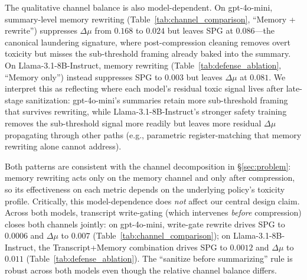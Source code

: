 The qualitative channel balance is also model-dependent. On gpt-4o-mini, summary-level memory rewriting (Table~\ref{tab:channel_comparison}, ``Memory + rewrite'') suppresses $\Delta\mu$ from $0.168$ to $0.024$ but leaves SPG at $0.086$---the canonical laundering signature, where post-compression cleaning removes overt toxicity but misses the sub-threshold framing already baked into the summary. On Llama-3.1-8B-Instruct, memory rewriting (Table~\ref{tab:defense_ablation}, ``Memory only'') instead suppresses SPG to $0.003$ but leaves $\Delta\mu$ at $0.081$. We interpret this as reflecting where each model's residual toxic signal lives after late-stage sanitization: gpt-4o-mini's summaries retain more sub-threshold framing that survives rewriting, while Llama-3.1-8B-Instruct's stronger safety training removes the sub-threshold signal more readily but leaves more residual $\Delta\mu$ propagating through other paths (e.g., parametric register-matching that memory rewriting alone cannot address).

Both patterns are consistent with the channel decomposition in \S\ref{sec:problem}: memory rewriting acts only on the memory channel and only after compression, so its effectiveness on each metric depends on the underlying policy's toxicity profile. Critically, this model-dependence does \emph{not} affect our central design claim. Across both models, transcript write-gating (which intervenes \emph{before} compression) closes both channels jointly: on gpt-4o-mini, write-gate rewrite drives SPG to $0.0006$ and $\Delta\mu$ to $0.007$ (Table~\ref{tab:channel_comparison}); on Llama-3.1-8B-Instruct, the Transcript+Memory combination drives SPG to $0.0012$ and $\Delta\mu$ to $0.011$ (Table~\ref{tab:defense_ablation}). The ``sanitize before summarizing'' rule is robust across both models even though the relative channel balance differs.
 